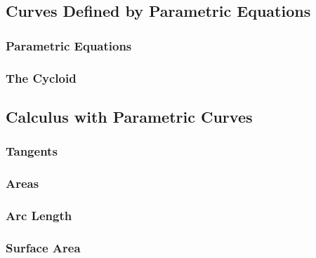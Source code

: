 \subsection{Curves Defined by Parametric Equations}

\subsubsection*{Parametric Equations}

\subsubsection*{The Cycloid}

\subsection{Calculus with Parametric Curves}

\subsubsection*{Tangents}

\subsubsection*{Areas}

\subsubsection*{Arc Length}

\subsubsection*{Surface Area}